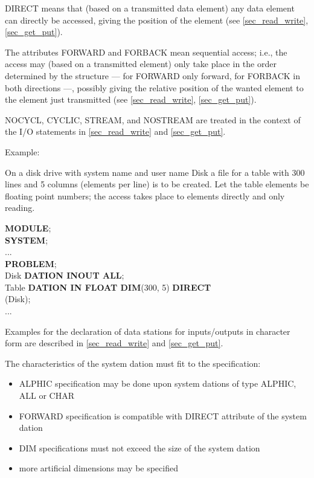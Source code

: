 DIRECT means that (based on a transmitted data element) any data element
can directly be accessed, giving the position of the element
(see \ref{sec_read_write}, \ref{sec_get_put}).

The attributes FORWARD and FORBACK mean sequential access; i.e., the
access may (based on a transmitted element) only take place in the order
determined by the structure --- for FORWARD only forward, for FORBACK in
both directions ---, possibly giving the relative position of the wanted
element to the element just transmitted 
(see \ref{sec_read_write}, \ref{sec_get_put}).


NOCYCL, CYCLIC, STREAM, and NOSTREAM are treated in the context of the
I/O statements in 
\ref{sec_read_write} and \ref{sec_get_put}.

Example:

On a disk drive with system name 
 and user name Disk a file for a
table with 300 lines and 5 columns (elements per line) is to be created.
Let the table elements be floating point numbers; the access takes place
to elements directly and only reading.

{\bf MODULE};\\

{\bf SYSTEM};\\
\x ... \\
\label{Example}
{\bf PROBLEM};\\
 Disk {\bf DATION INOUT  ALL};\\
 Table {\bf DATION IN FLOAT DIM}(300, 5) {\bf DIRECT}\\
\x {} (Disk);\\
\x ...

Examples for the declaration of data stations for inputs/outputs in
character form are described in 
\ref{sec_read_write} and \ref{sec_get_put}.

\begin{accepted}
The characteristics of the system dation must fit to the specification:
\begin{itemize}
\item ALPHIC specification may be done upon system dations of type ALPHIC,
   ALL or CHAR
\item FORWARD specification is compatible with DIRECT attribute
   of the system dation
\item DIM specifications must not exceed the size of the system dation
\item more artificial dimensions may be specified
\end{itemize}
\end{accepted}

